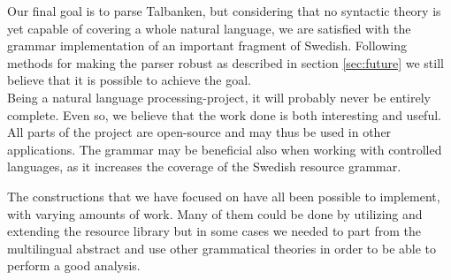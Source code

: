 \documentclass{report}
\begin{document}

Our final goal is to parse Talbanken, but considering that no syntactic theory is yet capable
of covering a whole natural language, we are satisfied with %
the grammar implementation of an important fragment of Swedish.
Following methods for making the parser robust as described in section \ref{sec:future}
we still believe that it is possible to achieve the goal. 
\\


Being a natural language processing-project, it will probably never be
entirely complete. Even so, we believe  
that the work done is both interesting and useful.
All parts of the project are open-source and may thus be used in other applications.
The grammar may be beneficial also when working with controlled languages,
as it increases the coverage of the Swedish resource grammar.

The constructions
that we have focused on have all been possible to implement, with varying  amounts
of work. Many of them could be done by utilizing and extending the resource library
but in some cases we needed to part from the multilingual abstract and use other
grammatical theories in order to be able to perform a good analysis.








\end{document}
